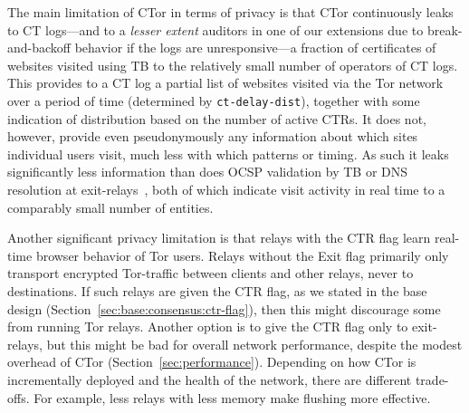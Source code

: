 The main limitation of CTor in terms of privacy is that CTor continuously leaks
to CT logs---and to a \emph{lesser extent} auditors in one of our extensions due
to break-and-backoff behavior if the logs are unresponsive---a fraction of
certificates of websites visited using TB to the relatively small number of
operators of CT logs.  This provides
to a CT log a partial list of websites visited via the Tor network over a period
of time (determined by \texttt{ct-delay-dist}), together with some indication of
distribution based on the number of active CTRs. It does not, however, provide
even pseudonymously any information about which sites individual users visit,
much less with which patterns or timing. As such it leaks significantly less
information than does OCSP validation by TB or DNS resolution at
exit-relays~\cite{TorDNS}, both of which indicate visit activity in real time to
a comparably small number of entities.

Another significant privacy limitation is that relays with the CTR flag learn
real-time browser behavior of Tor users. Relays without the Exit flag primarily
only transport encrypted Tor-traffic between clients and other relays, never to
destinations. If such relays are given the CTR flag, as we stated in the base
design (Section~\ref{sec:base:consensus:ctr-flag}), then this might discourage
some from running Tor relays. Another option is to give the CTR flag only to
exit-relays, but this might be bad for overall network performance, despite the
modest overhead of CTor (Section~\ref{sec:performance}). Depending on how CTor
is incrementally deployed and the health of the network, there are different
trade-offs. For example, less relays with less memory make flushing more
effective.
